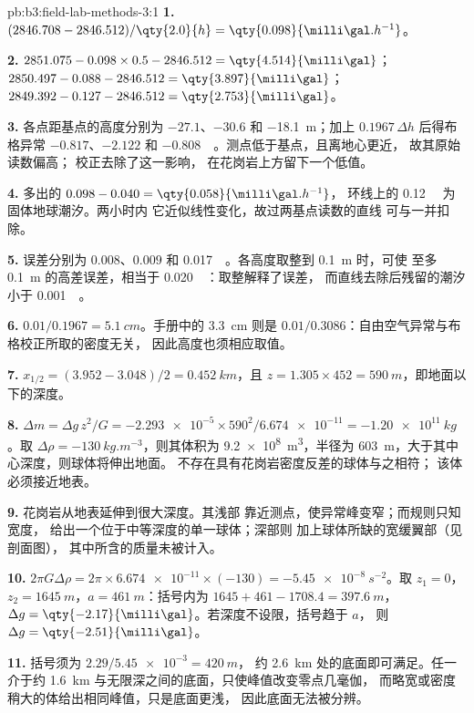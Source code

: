 \begin{solution}{pb:b3:field-lab-methods-3:1}
\textbf{1.} $(2846.708 - 2846.512)/\qty{2.0}{h} = \qty{0.098}{\milli\gal.h^{-1}}$。

\textbf{2.} $2851.075 - 0.098\times0.5 - 2846.512 = \qty{4.514}{\milli\gal}$；
$2850.497 - 0.088 - 2846.512 = \qty{3.897}{\milli\gal}$；
$2849.392 - 0.127 - 2846.512 = \qty{2.753}{\milli\gal}$。

\textbf{3.} 各点距基点的高度分别为 $-27.1$、$-30.6$ 和
\qty{-18.1}{m}；加上 $0.1967\,\Delta h$ 后得布格异常
$\num{-0.817}$、$\num{-2.122}$ 和 \qty{-0.808}{\milli\gal}。测点低于基点，且离地心更近，
故其原始读数偏高；
校正去除了这一影响，
在花岗岩上方留下一个低值。

\textbf{4.} 多出的 $0.098 - 0.040 = \qty{0.058}{\milli\gal.h^{-1}}$，
环线上的 \qty{0.12}{\milli\gal} 为固体地球潮汐。两小时内
它近似线性变化，故过两基点读数的直线
可与一并扣除。

\textbf{5.} 误差分别为 $\num{0.008}$、$\num{0.009}$ 和
\qty{0.017}{\milli\gal}。各高度取整到 \qty{0.1}{m} 时，可使
至多 \qty{0.1}{m} 的高差误差，相当于
\qty{0.020}{\milli\gal}：取整解释了误差，
而直线去除后残留的潮汐小于 \qty{0.001}{\milli\gal}。

\textbf{6.} $0.01/0.1967 = \qty{5.1}{cm}$。手册中的 \qty{3.3}{cm} 则是
$0.01/0.3086$：自由空气异常与布格校正所取的密度无关，
因此高度也须相应取值。

\textbf{7.} $x_{1/2} = (3.952 - 3.048)/2 = \qty{0.452}{km}$，且 $z = 1.305
\times452 = \qty{590}{m}$，即地面以下的深度。

\textbf{8.} $\Delta m = \Delta g\,z^2/G = \num{-2.293e-5}\times590^2/
\num{6.674e-11} = \qty{-1.20e11}{kg}$。取 $\Delta\rho =
\qty{-130}{kg.m^{-3}}$，则其体积为 \qty{9.2e8}{m^3}，半径为
\qty{603}{m}，大于其中心深度，则球体将伸出地面。
不存在具有花岗岩密度反差的球体与之相符；
该体必须接近地表。

\textbf{9.} 花岗岩从地表延伸到很大深度。其浅部
靠近测点，使异常峰变窄；而规则只知宽度，
给出一个位于中等深度的单一球体；深部则
加上球体所缺的宽缓翼部（见剖面图），
其中所含的质量未被计入。

\textbf{10.} $2\pi G\Delta\rho = 2\pi\times\num{6.674e-11}\times(-130) =
\qty{-5.45e-8}{s^{-2}}$。取 $z_1 = 0$，$z_2 = \qty{1645}{m}$，$a =
\qty{461}{m}$：括号内为 $1645 + 461 - 1708.4 = \qty{397.6}{m}$，
$\Delta g = \qty{-2.17}{\milli\gal}$。若深度不设限，括号趋于 $a$，
则 $\Delta g = \qty{-2.51}{\milli\gal}$。

\textbf{11.} 括号须为 $2.29/\num{5.45e-3} = \qty{420}{m}$，
约 \qty{2.6}{km} 处的底面即可满足。任一介于约
\qty{1.6}{km} 与无限深之间的底面，只使峰值改变零点几毫伽，
而略宽或密度稍大的体给出相同峰值，只是底面更浅，
因此底面无法被分辨。


\end{solution}
